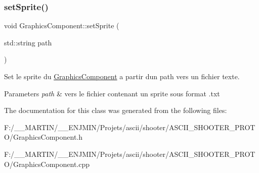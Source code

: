 \subsubsection{\texorpdfstring{set\+Sprite()}{setSprite()}}
{\footnotesize\ttfamily void Graphics\+Component\+::set\+Sprite (\begin{DoxyParamCaption}\item[{std\+::string}]{path }\end{DoxyParamCaption})}



Set le sprite du \hyperlink{class_graphics_component}{Graphics\+Component} a partir d\textquotesingle{}un path vers un fichier texte. 


\begin{DoxyParams}{Parameters}
{\em path} & vers le fichier contenant un sprite sous format .txt \\
\hline
\end{DoxyParams}


The documentation for this class was generated from the following files\+:\begin{DoxyCompactItemize}
\item 
F\+:/\+\_\+\+\_\+\+M\+A\+R\+T\+I\+N/\+\_\+\+\_\+\+E\+N\+J\+M\+I\+N/\+Projets/ascii/shooter/\+A\+S\+C\+I\+I\+\_\+\+S\+H\+O\+O\+T\+E\+R\+\_\+\+P\+R\+O\+T\+O/Graphics\+Component.\+h\item 
F\+:/\+\_\+\+\_\+\+M\+A\+R\+T\+I\+N/\+\_\+\+\_\+\+E\+N\+J\+M\+I\+N/\+Projets/ascii/shooter/\+A\+S\+C\+I\+I\+\_\+\+S\+H\+O\+O\+T\+E\+R\+\_\+\+P\+R\+O\+T\+O/Graphics\+Component.\+cpp\end{DoxyCompactItemize}
